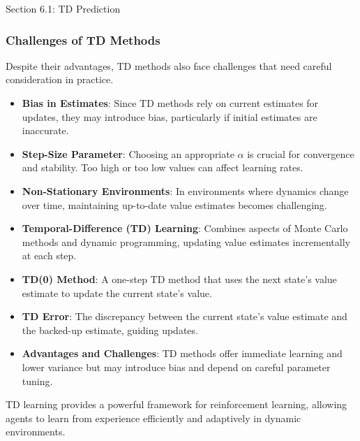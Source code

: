 \begin{notes}{Section 6.1: TD Prediction}
\begin{highlight}
    \end{highlight}
    
    \subsubsection*{Challenges of TD Methods}
    
    Despite their advantages, TD methods also face challenges that need careful consideration in practice.
    
    \begin{highlight}
    
        \begin{itemize}
            \item \textbf{Bias in Estimates}: Since TD methods rely on current estimates for updates, they may introduce bias, particularly if initial estimates are inaccurate.
            \item \textbf{Step-Size Parameter}: Choosing an appropriate $\alpha$ is crucial for convergence and stability. Too high or too low values can affect learning rates.
            \item \textbf{Non-Stationary Environments}: In environments where dynamics change over time, maintaining up-to-date value estimates becomes challenging.
        \end{itemize}
    
    \end{highlight}
    
    \begin{highlight}
    
        \begin{itemize}
            \item \textbf{Temporal-Difference (TD) Learning}: Combines aspects of Monte Carlo methods and dynamic programming, updating value estimates incrementally at each step.
            \item \textbf{TD(0) Method}: A one-step TD method that uses the next state's value estimate to update the current state's value.
            \item \textbf{TD Error}: The discrepancy between the current state's value estimate and the backed-up estimate, guiding updates.
            \item \textbf{Advantages and Challenges}: TD methods offer immediate learning and lower variance but may introduce bias and depend on careful parameter tuning.
        \end{itemize}
    
        TD learning provides a powerful framework for reinforcement learning, allowing agents to learn from experience efficiently and adaptively in dynamic environments.
    
    \end{highlight}
\end{notes}

